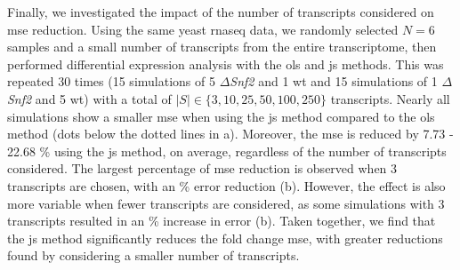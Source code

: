 
Finally, we investigated the impact of the number of transcripts considered on \gls{mse} reduction.
Using the same yeast \gls{rnaseq} data, we randomly selected $N = 6$ samples and a small number of transcripts from the entire transcriptome, then performed differential expression analysis with the \gls{ols} and \gls{js} methods.
This was repeated 30 times (15 simulations of 5 $\Delta$\emph{Snf2} and 1 \gls{wt} and 15 simulations of 1 $\Delta$\emph{Snf2} and 5 \gls{wt}) with a total of $|S| \in \{ 3, 10, 25, 50, 100, 250 \}$ transcripts.
Nearly all simulations show a smaller \gls{mse} when using the \gls{js} method compared to the \gls{ols} method (dots below the dotted lines in a).
Moreover, the \gls{mse} is reduced by 7.73 - 22.68 \% using the \gls{js} method, on average, regardless of the number of transcripts considered.
The largest percentage of \gls{mse} reduction is observed when 3 transcripts are chosen, with an  \% error reduction (b).
However, the effect is also more variable when fewer transcripts are considered, as some simulations with 3 transcripts resulted in an  \% increase in error (b).
Taken together, we find that the \gls{js} method significantly reduces the fold change \gls{mse}, with greater reductions found by considering a smaller number of transcripts.

